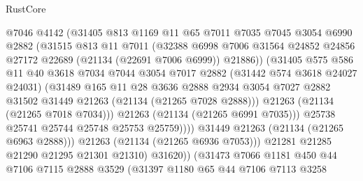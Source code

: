 \begin{lexlean}{RustCore}
\begin{coremodule}
                      @7046
                      @4142
                      (@31405
                        @813
                        @1169
                        @11
                        @65
                        @7011
                        @7035
                        @7045
                        @3054
                        @6990
                        @2882
                        (@31515
                          @813
                          @11
                          @7011
                          (@32388
                            @6998
                            @7006
                            @31564
                            @24852
                            @24856
                            @27172
                            @22689
                            (@21134 (@22691 @7006 @6999))
                            @21886))
                        (@31405
                          @575
                          @586
                          @11
                          @40
                          @3618
                          @7034
                          @7044
                          @3054
                          @7017
                          @2882
                          (@31442 @574 @3618 @24027 @24031)
                          (@31489
                            @165
                            @11
                            @28
                            @3636
                            @2888
                            @2934
                            @3054
                            @7027
                            @2882
                            @31502
                            @31449
                            @21263
                            (@21134 (@21265 @7028 @2888)))
                          @21263
                          (@21134 (@21265 @7018 @7034)))
                        @21263
                        (@21134 (@21265 @6991 @7035)))
                      @25738
                      @25741
                      @25744
                      @25748
                      @25753
                      @25759))))
              @31449
              @21263
              (@21134 (@21265 @6963 @2888)))
            @21263
            (@21134 (@21265 @6936 @7053)))
          @21281
          @21285
          @21290
          @21295
          @21301
          @21310)
        @31620))
    (@31473
      @7066
      @1181
      @450
      @44
      @7106
      @7115
      @2888
      @3529
      (@31397
        @1180
        @65
        @44
        @7106
        @7113
        @3258

\end{coremodule}
\end{lexlean}
